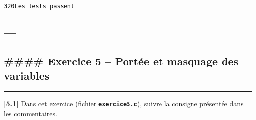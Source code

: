 \documentclass[11pt]{article}
\begin{document}
    \begin{Verbatim}[commandchars=\\\{\}]
320Les tests passent
    \end{Verbatim}

    \hypertarget{section}{%
\subsection{---}\label{section}}

\hypertarget{exercice-5-portuxe9e-et-masquage-des-variables}{%
\subsection{\#\#\#\# Exercice 5 -- Portée et masquage des
variables}\label{exercice-5-portuxe9e-et-masquage-des-variables}}

\begin{center}\rule{0.5\linewidth}{0.5pt}\end{center}

\textbf{{[}5.1{]}} Dans cet exercice (fichier
\textbf{\texttt{exercice5.c}}), suivre la consigne présentée dans les
commentaires.
\end{document}
